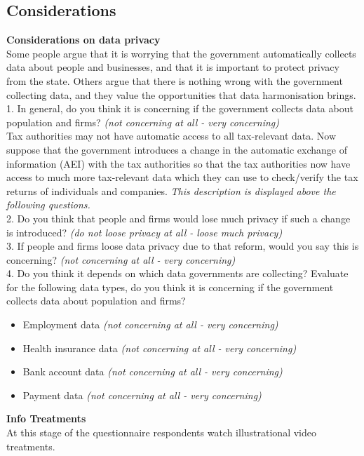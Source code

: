 \documentclass[11pt]{article}
\begin{document}
\subsection*{Considerations}
\textbf{Considerations on data privacy}\\[0.5em]
Some people argue that it is worrying that the government automatically collects data about people and businesses, and that it is important to protect privacy from the state. Others argue that there is nothing wrong with the government collecting data, and they value the opportunities that data harmonisation brings. \\[0.5em]
1. In general, do you think it is concerning if the government collects data about population and firms? \textit{(not concerning at all - very concerning)} \\[1em]
Tax authorities may not have automatic access to all tax-relevant data. Now suppose that the government introduces a change in the automatic exchange of information (AEI) with the tax authorities so that the tax authorities now have access to much more tax-relevant data which they can use to check/verify the tax returns of individuals and companies. \textit{This description is displayed above the following questions.} \\[0.5em]
2. Do you think that people and firms would lose much privacy if such a change is introduced? \textit{(do not loose privacy at all - loose much privacy)} \\[0.5em]
3. If people and firms loose data privacy due to that reform, would you say this is concerning? \textit{(not concerning at all - very concerning)} \\[0.5em]
4. Do you think it depends on which data governments are collecting? Evaluate for the following data types, do you think it is concerning if the government collects data about population and firms? 
\begin{itemize}
    \item Employment data \textit{(not concerning at all - very concerning)}
    \item Health insurance data \textit{(not concerning at all - very concerning)}
    \item Bank account data \textit{(not concerning at all - very concerning)}
    \item Payment data \textit{(not concerning at all - very concerning)}
\end{itemize}
\textbf{Info Treatments}\\[0.5em]
At this stage of the questionnaire respondents watch illustrational video treatments. 
\end{document}
